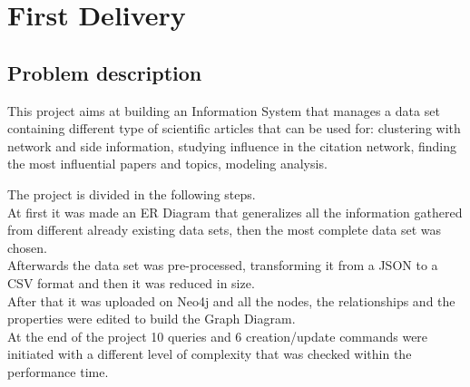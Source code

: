 \documentclass{Configuration_Files/PoliMi3i_thesis}
\begin{document}
\mainmatter %

%


\cleardoublepage
\newpage
\newpage
\chapter{First Delivery}
\label{ch:delivery1}
\section{Problem description}
\label{se:probdes1}
This project aims at building an Information System that manages a data set containing different type of scientific articles that can be used for: clustering with network and side information, studying influence in the citation network, finding the most influential papers and topics, modeling analysis.

The project is divided in the following steps.\\
At first it was made an ER Diagram that generalizes all the information gathered from different already existing data sets, then the most complete data set was chosen.\\
Afterwards the data set was pre-processed, transforming it from a JSON to a CSV format and then it was reduced in size.\\
After that it was uploaded on Neo4j and all the nodes, the relationships and the properties were edited to build the Graph Diagram.\\
At the end of the project 10 queries and 6 creation/update commands were initiated with a different level of complexity that was checked within the performance time.\\
\end{document}
